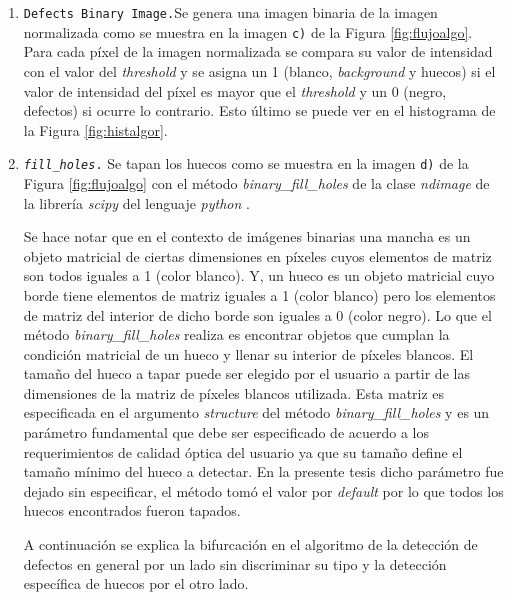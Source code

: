 \begin{enumerate}
\item \texttt{Defects Binary Image.}Se genera una imagen binaria de la imagen normalizada como se muestra en la imagen \texttt{c)} de la Figura \ref{fig:flujoalgo}. Para cada píxel de la imagen normalizada se compara su valor de intensidad con el valor del \textit{threshold} y se asigna un 1 (blanco, \textit{background} y huecos) si el valor de intensidad del píxel es mayor que el \textit{threshold} y un 0 (negro, defectos) si ocurre lo contrario. Esto último se puede ver en el histograma de la Figura \ref{fig:histalgor}.
\item \texttt{\textit{fill\_holes}.} Se tapan los huecos como se muestra en la imagen \texttt{d)} de la Figura \ref{fig:flujoalgo} con el método \textit{binary\_fill\_holes} de la clase \textit{ndimage} de la librería \textit{scipy} del lenguaje \textit{python} \cite{scipy}.

\hspace{0.5cm}Se hace notar que en el contexto de imágenes binarias una mancha es un objeto matricial de ciertas dimensiones en píxeles cuyos elementos de matriz son todos iguales a 1 (color blanco). Y, un hueco es un objeto matricial cuyo borde tiene elementos de matriz iguales a 1 (color blanco) pero los elementos de matriz del interior de dicho borde son iguales a 0 (color negro). Lo que el método \textit{binary\_fill\_holes} realiza es encontrar objetos que cumplan la condición matricial de un hueco y llenar su interior de píxeles blancos. El tamaño del hueco a tapar puede ser elegido por el usuario a partir de las dimensiones de la matriz de píxeles blancos utilizada. Esta matriz es especificada en el argumento \textit{structure} del método \textit{binary\_fill\_holes} y es un parámetro fundamental que debe ser especificado de acuerdo a los requerimientos de calidad óptica del usuario ya que su tamaño define el tamaño mínimo del hueco a detectar. En la presente tesis dicho parámetro fue dejado sin especificar, el método tomó el valor por \textit{default} por lo que todos los huecos encontrados fueron tapados.

\hspace{0.5cm}A continuación se explica la bifurcación en el algoritmo de la detección de defectos en general por un lado sin discriminar su tipo y la detección específica de huecos por el otro lado.


\end{enumerate}
